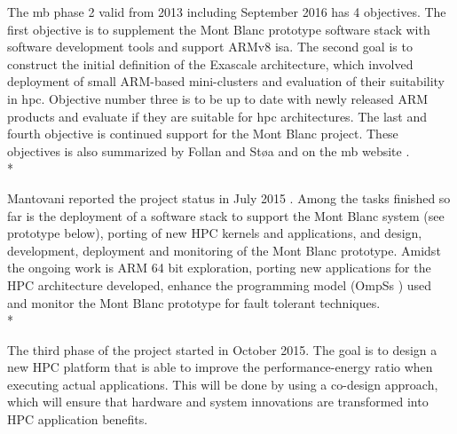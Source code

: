 The \gls{mb} phase 2 valid from 2013 including September 2016 has 4 objectives. The first objective is to supplement the Mont Blanc prototype software stack with software development tools and support ARMv8 \gls{isa}. The second goal is to construct the initial definition of the Exascale architecture, which involved deployment of small ARM-based mini-clusters and evaluation of their suitability in \gls{hpc}. Objective number three is to be up to date with newly released ARM products and evaluate if they are suitable for \gls{hpc} architectures. The last and fourth objective is continued support for the Mont Blanc project. These objectives is also summarized by Follan and Støa \cite{mt:T&S} and on the \gls{mb} website \cite{m:MB}.\\*

Mantovani reported the project status in July 2015 \cite{m:MB-15}. Among the tasks finished so far is the deployment of a software stack to support the Mont Blanc system (see prototype below), porting of new HPC kernels and applications, and design, development, deployment and monitoring of the Mont Blanc prototype. Amidst the ongoing work is ARM 64 bit exploration, porting new applications for the HPC architecture developed, enhance the programming model (OmpSs \cite{m:ompss}) used and monitor the Mont Blanc prototype for fault tolerant techniques. \\*

The third phase of the project started in October 2015. The goal is to design a new HPC platform that is able to improve the performance-energy ratio when executing actual applications. This will be done by using a co-design approach, which will ensure that hardware and system innovations are transformed into HPC application benefits.

